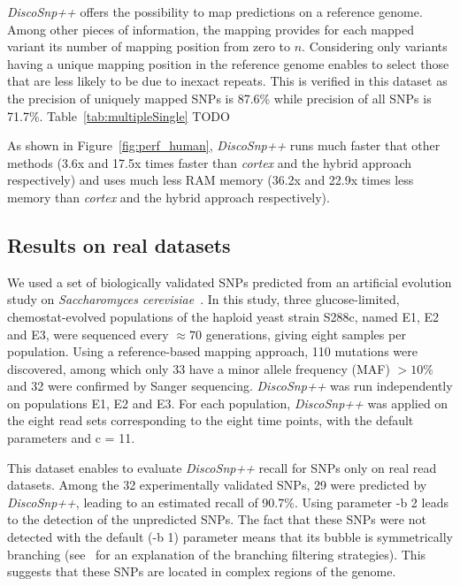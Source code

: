 \documentclass{bmcart}
\newcommand{\discopp}{{\it DiscoSnp++}\xspace}
\newcommand{\co}{{\it cortex}\xspace}
\begin{document}
\discopp offers the possibility to map predictions on a reference genome. Among other pieces of information, the mapping provides for each mapped variant its number of mapping position from zero to $n$. Considering only variants having a unique mapping position in the reference genome enables to select those that are less likely to be due to inexact repeats. This is verified in this dataset as the precision of uniquely mapped SNPs is 87.6\% while precision of all SNPs is 71.7\%.
Table~\ref{tab:multipleSingle} TODO

As shown in Figure~\ref{fig:perf_human}, \discopp runs much faster that other methods (3.6x and 17.5x times faster than \co and the hybrid approach respectively) and uses much less RAM memory (36.2x and 22.9x times less memory than \co and the hybrid approach respectively). 






\subsection*{Results on real datasets}
We used a set of biologically validated SNPs predicted from an artificial evolution study on \emph{Saccharomyces cerevisiae}~\cite{Kvitek2013}. 
In this study, three glucose-limited, chemostat-evolved populations of the haploid yeast strain S288c, named
E1, E2 and E3, were sequenced every $\approx70$ generations, giving eight samples per population. Using a reference-based mapping approach, 110 mutations were discovered, among which only 33 have a minor allele frequency (MAF) $>10\%$ and 32 were confirmed by Sanger sequencing.  \discopp was run independently on populations E1, E2 and E3. For each population, \discopp was applied on the eight read sets corresponding to the eight time points, with the default parameters and c = 11. 

This dataset enables to evaluate \discopp recall for SNPs only on real read datasets. Among the 32 experimentally validated SNPs, 29 were predicted by \discopp, leading to an estimated recall of 90.7\%. Using parameter -b 2 leads to the detection of the unpredicted SNPs. The fact that these SNPs were not detected with the default (-b 1) parameter means that its bubble is symmetrically branching (see~\cite{Uricaru2014a} for an explanation of the branching filtering strategies). This suggests that these SNPs are located in complex regions of the genome. 
\end{document}
